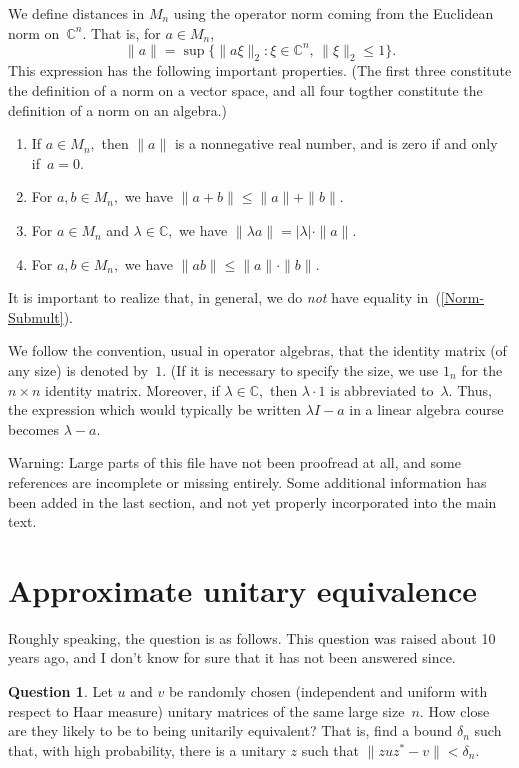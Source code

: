 \documentclass[10pt]{amsart}
\theoremstyle{definition}
\newtheorem{qst}[thm]{Question}
\newcommand{\dt}{\delta}
\newcommand{\ld}{\lambda}
\newcommand{\C}{{\mathbb{C}}}
\newcommand{\ifo}{if and only if}
\begin{document}
We define distances in $M_n$ using the operator norm coming from
the Euclidean norm on~$\C^n.$
That is, for $a \in M_n,$
\[
\| a \|
 = \sup \big\{ \| a \xi \|_2 \colon
      \xi \in \C^n, \, \| \xi \|_2 \leq 1 \big\}.
\]
This expression has the following important properties.
(The first three constitute the definition of a norm on a vector space,
and all four togther constitute the definition of a norm on an algebra.)
\begin{enumerate}
\item\label{Norm-Pos}
If $a \in M_n,$ then $\| a \|$ is a nonnegative real number,
and is zero \ifo\  $a = 0.$
\item\label{Norm-Subadd}
For $a, b \in M_n,$ we have $\| a + b \| \leq \| a \| + \| b \|.$
\item\label{Norm-Homog}
For $a \in M_n$ and $\ld \in \C,$
we have $\| \ld a \| = | \ld | \cdot \| a \|.$
\item\label{Norm-Submult}
For $a, b \in M_n,$ we have $\| a b \| \leq \| a \| \cdot \| b \|.$
\end{enumerate}
It is important to realize that, in general,
we do {\emph{not}} have equality in~(\ref{Norm-Submult}).

We follow the convention, usual in operator algebras,
that the identity matrix (of any size) is denoted by~$1.$
(If it is necessary to specify the size,
we use $1_n$ for the $n \times n$ identity matrix.
Moreover, if $\ld \in \C,$
then $\ld \cdot 1$ is abbreviated to~$\ld.$
Thus, the expression which would typically be written
$\ld I - a$ in a linear algebra course becomes $\ld - a.$

Warning:
Large parts of this file have not been proofread at all,
and some references are incomplete or missing entirely.
Some additional information has been added in the last section,
and not yet properly incorporated into the main text.

\section{Approximate unitary equivalence}\label{Sec:AUE}

Roughly speaking, the question is as follows.
This question was raised about 10 years ago,
and I don't know for sure that it has not been answered since.

\begin{qst}\label{Q-aue-inf}
Let $u$ and $v$ be randomly chosen (independent and uniform
with respect to Haar measure) unitary matrices of the same large
size~$n.$
How close are they likely to be to being unitarily equivalent?
That is, find a bound $\dt_n$ such that, with high
probability, there is a unitary $z$ such that
$\| z u z^* - v \| < \dt_n.$
\end{qst}
\end{document}
